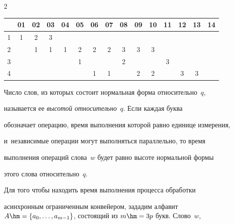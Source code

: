 \begin{multicols}{2}
\begin{table}[b]
  \begin{center}




  \vspace*{2ex}


  


  \begin{tabular}{|c|c|c|c|c|c|c|c|c|c|c|c|c|c|c|}


  \hline


&01 &02&03&04&05&06&07&08&09&10&11&12&13&14\\


\hline


1&1&2&3&&&&&&&&&&&\\


2&&1&1&1&2&2&2&3&3&3&&&&\\


3&&&&&1&&&2&&&3&&&\\


4&&&&&&1&1&&2&2&&3&3&\\


\hline


\end{tabular}


\end{center}


\end{table}


     


  


  Число слов, из которых состоит нормальная форма относительно~$q$, 


называется ее \textit{высотой относительно}~$q$. Если каждая буква 


обозначает операцию, время выполнения которой равно единице измерения, 


и~независимые операции могут выполняться параллельно, то время 


выполнения операций слова~$w$ будет равно высоте нормальной формы 


этого слова относительно~$q$. 


  


  Для того чтобы находить время выполнения процесса обработки 


асинхронным ограниченным конвейером, зададим алфавит $A\hm= \{a_0, 


\ldots, a_{m-1}\}$, состоящий из $m\hm=3p$ букв. Слово~$w$, 



\end{multicols}
